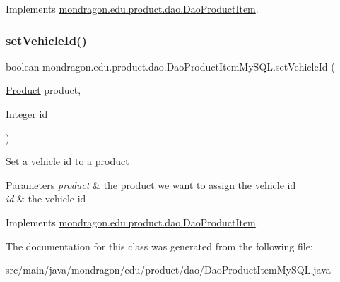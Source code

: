 Implements \mbox{\hyperlink{interfacemondragon_1_1edu_1_1product_1_1dao_1_1_dao_product_item}{mondragon.\+edu.\+product.\+dao.\+Dao\+Product\+Item}}.

\mbox{\label{classmondragon_1_1edu_1_1product_1_1dao_1_1_dao_product_item_my_s_q_l_a30861c4e6430b735f2516ae579c72af3}} 
\subsubsection{\texorpdfstring{setVehicleId()}{setVehicleId()}}
{\footnotesize\ttfamily boolean mondragon.\+edu.\+product.\+dao.\+Dao\+Product\+Item\+My\+S\+Q\+L.\+set\+Vehicle\+Id (\begin{DoxyParamCaption}\item[{\mbox{\hyperlink{classmondragon_1_1edu_1_1clases_1_1_product}{Product}}}]{product,  }\item[{Integer}]{id }\end{DoxyParamCaption})\hspace{0.3cm}{\ttfamily [inline]}}

Set a vehicle id to a product


\begin{DoxyParams}{Parameters}
{\em product} & the product we want to assign the vehicle id \\
\hline
{\em id} & the vehicle id \\
\hline
\end{DoxyParams}


Implements \mbox{\hyperlink{interfacemondragon_1_1edu_1_1product_1_1dao_1_1_dao_product_item}{mondragon.\+edu.\+product.\+dao.\+Dao\+Product\+Item}}.



The documentation for this class was generated from the following file\+:\begin{DoxyCompactItemize}
\item 
src/main/java/mondragon/edu/product/dao/Dao\+Product\+Item\+My\+S\+Q\+L.\+java\end{DoxyCompactItemize}
